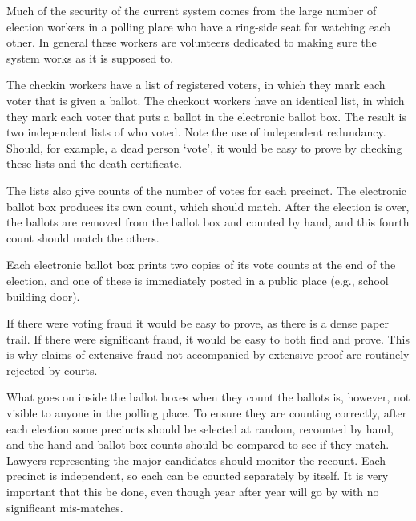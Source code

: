 \documentclass[12pt]{article}
\begin{document}
Much of the security of the current system comes from the large
number of election workers in a polling place who have
a ring-side seat for watching each other.  In general these workers
are volunteers dedicated to making sure the system
works as it is supposed to.

The checkin workers have a list of registered voters, in which
they mark each voter that is given a ballot.  The checkout workers
have an identical list, in which they mark each voter that puts
a ballot in the electronic ballot box.  The result is two independent
lists of who voted.  Note the use of independent redundancy.
Should, for example, a dead person `vote', it
would be easy to prove by checking these lists and the death certificate.

The lists also give counts of the number of votes for each precinct.
The electronic ballot box produces its own count, which should match.
After the election is over, the ballots are removed from the ballot box
and counted by hand, and this fourth count should match the others.

Each electronic ballot box prints two copies of its vote counts
at the end of the election,
and one of these is immediately posted in a public place (e.g., school
building door).

If there were voting fraud it would be easy to prove, as there is
a dense paper trail.  If there were significant fraud, it would be
easy to both find and prove.  This is why claims of extensive
fraud not accompanied by extensive proof are routinely rejected by courts.

What goes on inside the ballot boxes when they count the ballots
is, however, not visible to anyone in the polling place.  To ensure
they are counting correctly, after each election some precincts
should be selected at random, recounted by hand, and the hand and ballot
box counts should be compared to see if they match.
Lawyers representing the major candidates should monitor the recount.
Each precinct is independent, so each can be counted separately
by itself.  It is very
important that this be done, even though year after year will go
by with no significant mis-matches.
\end{document}
